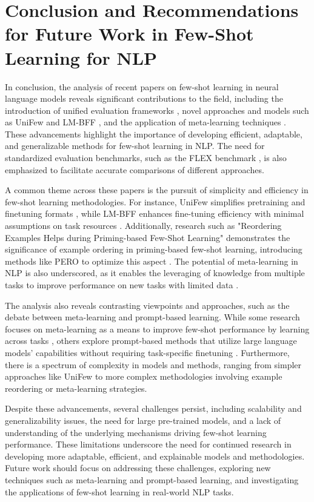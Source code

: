 \documentclass[conference]{IEEEtran}
\begin{document}
\section{Conclusion and Recommendations for Future Work in Few-Shot Learning for NLP}
In conclusion, the analysis of recent papers on few-shot learning in neural language models reveals significant contributions to the field, including the introduction of unified evaluation frameworks \cite{b1}, novel approaches and models such as UniFew \cite{b2} and LM-BFF \cite{b3}, and the application of meta-learning techniques \cite{b4}. These advancements highlight the importance of developing efficient, adaptable, and generalizable methods for few-shot learning in NLP. The need for standardized evaluation benchmarks, such as the FLEX benchmark \cite{b1}, is also emphasized to facilitate accurate comparisons of different approaches.

A common theme across these papers is the pursuit of simplicity and efficiency in few-shot learning methodologies. For instance, UniFew simplifies pretraining and finetuning formats \cite{b2}, while LM-BFF enhances fine-tuning efficiency with minimal assumptions on task resources \cite{b3}. Additionally, research such as "Reordering Examples Helps during Priming-based Few-Shot Learning" demonstrates the significance of example ordering in priming-based few-shot learning, introducing methods like PERO to optimize this aspect \cite{b5}. The potential of meta-learning in NLP is also underscored, as it enables the leveraging of knowledge from multiple tasks to improve performance on new tasks with limited data \cite{b4}.

The analysis also reveals contrasting viewpoints and approaches, such as the debate between meta-learning and prompt-based learning. While some research focuses on meta-learning as a means to improve few-shot performance by learning across tasks \cite{b4}, others explore prompt-based methods that utilize large language models' capabilities without requiring task-specific finetuning \cite{b2}. Furthermore, there is a spectrum of complexity in models and methods, ranging from simpler approaches like UniFew \cite{b2} to more complex methodologies involving example reordering or meta-learning strategies.

Despite these advancements, several challenges persist, including scalability and generalizability issues, the need for large pre-trained models, and a lack of understanding of the underlying mechanisms driving few-shot learning performance. These limitations underscore the need for continued research in developing more adaptable, efficient, and explainable models and methodologies. Future work should focus on addressing these challenges, exploring new techniques such as meta-learning and prompt-based learning, and investigating the applications of few-shot learning in real-world NLP tasks.
\end{document}

